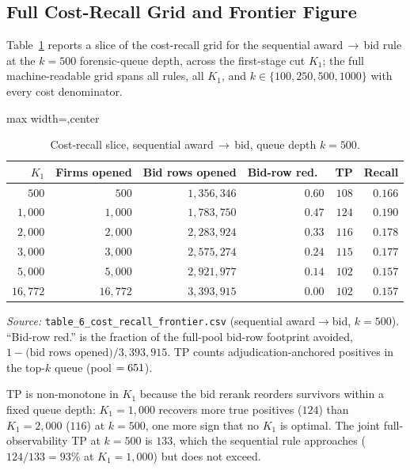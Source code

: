 \subsection{Full Cost-Recall Grid and Frontier Figure}
\label{supp:cost_grid}

Table~\ref{supp:tab_G_frontier} reports a slice of the cost-recall grid
for the sequential award\,$\to$\,bid rule at the $k=500$ forensic-queue
depth, across the first-stage cut $K_1$; the full machine-readable grid
spans all rules, all $K_1$, and $k \in \{100,250,500,1000\}$ with every
cost denominator.

\begin{table}[htbp]\centering
\begin{adjustbox}{max width=\textwidth,center}
\begin{threeparttable}
\caption{Cost-recall slice, sequential award\,$\to$\,bid, queue depth $k=500$.}
\label{supp:tab_G_frontier}
\scriptsize
\begin{tabular}{rrrrrr}
\toprule
$K_1$ & Firms opened & Bid rows opened & Bid-row red.\ & TP & Recall \\
\midrule
$500$    & $500$    & $1{,}356{,}346$ & $0.60$ & $108$ & $0.166$ \\
$1{,}000$ & $1{,}000$ & $1{,}783{,}750$ & $0.47$ & $124$ & $0.190$ \\
$2{,}000$ & $2{,}000$ & $2{,}283{,}924$ & $0.33$ & $116$ & $0.178$ \\
$3{,}000$ & $3{,}000$ & $2{,}575{,}274$ & $0.24$ & $115$ & $0.177$ \\
$5{,}000$ & $5{,}000$ & $2{,}921{,}977$ & $0.14$ & $102$ & $0.157$ \\
$16{,}772$ & $16{,}772$ & $3{,}393{,}915$ & $0.00$ & $102$ & $0.157$ \\
\bottomrule
\end{tabular}
\begin{tablenotes}\scriptsize
\item \textit{Source:} \texttt{table\_6\_cost\_recall\_frontier.csv}
(sequential award$\to$bid, $k=500$). ``Bid-row red.'' is the
fraction of the full-pool bid-row footprint avoided,
$1-\text{(bid rows opened)}/3{,}393{,}915$. TP counts
adjudication-anchored positives in the top-$k$ queue (pool $=651$).
\item TP is non-monotone in $K_1$ because the bid rerank reorders
survivors within a fixed queue depth: $K_1=1{,}000$ recovers more true
positives ($124$) than $K_1=2{,}000$ ($116$) at $k=500$, one more sign
that no $K_1$ is optimal. The joint full-observability TP at $k=500$ is
$133$, which the sequential rule approaches ($124/133 = 93\%$ at
$K_1=1{,}000$) but does not exceed.
\end{tablenotes}
\end{threeparttable}
\end{adjustbox}
\end{table}

